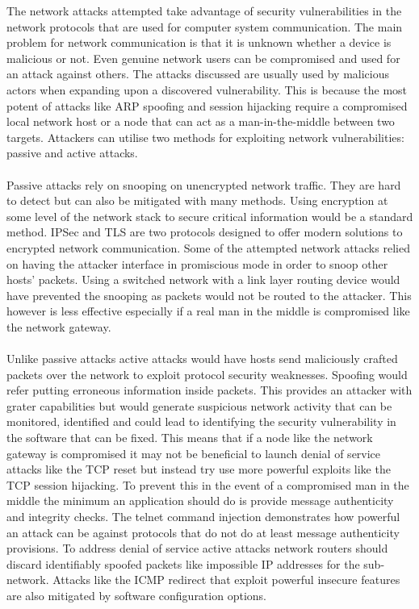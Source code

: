 The network attacks attempted take advantage of security vulnerabilities in the network protocols that are used for computer system communication. The main problem for network communication is that it is unknown whether a device is malicious or not. Even genuine network users can be compromised and used for an attack against others. The attacks discussed are usually used by malicious actors when expanding upon a discovered vulnerability. This is because the most potent of attacks like ARP spoofing and session hijacking require a compromised local network host or a node that can act as a man-in-the-middle between two targets. Attackers can utilise two methods for exploiting network vulnerabilities: passive and active attacks. 
\\
\\
Passive attacks rely on snooping on unencrypted network traffic. They are hard to detect but can also be mitigated with many methods. Using encryption at some level of the network stack to secure critical information would be a standard method. IPSec and TLS are two protocols designed to offer modern solutions to encrypted network communication. Some of the attempted network attacks relied on having the attacker interface in promiscious mode in order to snoop other hosts' packets. Using a switched network with a link layer routing device would have prevented the snooping as packets would not be routed to the attacker. This however is less effective especially if a real man in the middle is compromised like the network gateway. 
\\
\\
Unlike passive attacks active attacks would have hosts send maliciously crafted packets over the network to exploit protocol security weaknesses. Spoofing would refer putting erroneous information inside packets. This provides an attacker with grater capabilities but would generate suspicious network activity that can be monitored, identified and could lead to identifying the security vulnerability in the software that can be fixed. This means that if a node like the network gateway is compromised it may not be beneficial to launch denial of service attacks like the TCP reset but instead try use more powerful exploits like the TCP session hijacking. To prevent this in the event of a compromised man in the middle the minimum an application should do is provide message authenticity and integrity checks. The telnet command injection demonstrates how powerful an attack can be against protocols that do not do at least message authenticity provisions. To address denial of service active attacks network routers should discard identifiably spoofed packets like impossible IP addresses for the sub-network. Attacks like the ICMP redirect that exploit powerful insecure features are also mitigated by software configuration options.
